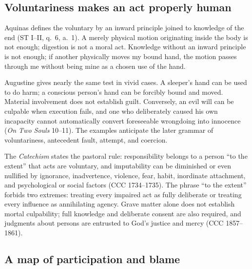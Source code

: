 \subsection{Voluntariness makes an act properly human}

Aquinas defines the voluntary by an inward principle joined to knowledge of the end (ST I--II, q.~6, a.~1). A merely physical motion originating inside the body is not enough; digestion is not a moral act. Knowledge without an inward principle is not enough; if another physically moves my bound hand, the motion passes through me without being mine as a chosen use of the hand.

Augustine gives nearly the same test in vivid cases. A sleeper's hand can be used to do harm; a conscious person's hand can be forcibly bound and moved. Material involvement does not establish guilt. Conversely, an evil will can be culpable when execution fails, and one who deliberately caused his own incapacity cannot automatically convert foreseeable wrongdoing into innocence (\emph{On Two Souls} 10--11). The examples anticipate the later grammar of voluntariness, antecedent fault, attempt, and coercion.

The \emph{Catechism} states the pastoral rule: responsibility belongs to a person ``to the extent'' that acts are voluntary, and imputability can be diminished or even nullified by ignorance, inadvertence, violence, fear, habit, inordinate attachment, and psychological or social factors (CCC 1734--1735). The phrase ``to the extent'' forbids two extremes: treating every impaired act as fully deliberate or treating every influence as annihilating agency. Grave matter alone does not establish mortal culpability; full knowledge and deliberate consent are also required, and judgments about persons are entrusted to God's justice and mercy (CCC 1857--1861).

\subsection{A map of participation and blame}

